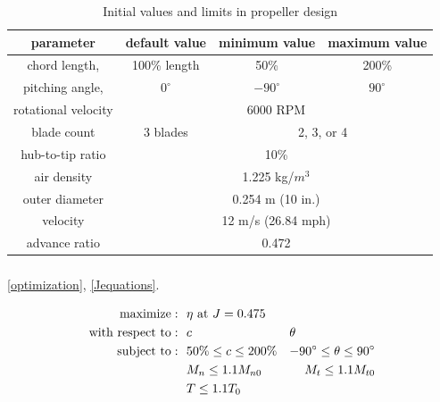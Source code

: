\documentclass[journal ]{new-aiaa}
\newcounter{ctab}
\begin{document}
\begin{table}[H]
 \centering
 \begin{tabular}{| c | c | c | c |} \hline
 	 \textbf{parameter} & \textbf{default value} & \textbf{minimum value} & \textbf{maximum value} \\ \hline
	 chord length, & 100\% length & 50\% & 200\% \\ \hline
	 pitching angle, & $0^{\circ}$ & $-90^{\circ}$ & $90^{\circ}$ \\ \hline \hline
	 rotational velocity & \multicolumn{3}{c|}{6000 RPM} \\ \hline
	 blade count & 3 blades & \multicolumn{2}{c|}{2, 3, or 4}\\ \hline
	 hub-to-tip ratio & \multicolumn{3}{c|}{10\%} \\ \hline
	 air density & \multicolumn{3}{c|}{1.225 kg/$m^{3}$} \\ \hline
	 outer diameter & \multicolumn{3}{c|}{0.254 m (10 in.)} \\ \hline
	 velocity & \multicolumn{3}{c|}{12 m/s (26.84 mph)} \\ \hline
	 advance ratio & \multicolumn{3}{c|}{0.472} \\ \hline
 \end{tabular}
 \caption{Initial values and limits in propeller design}
 \label{ctab}
\end{table}

\subsubsection{}

 \eqref{optimization},  \eqref{Jequations}. 

\begin{equation}
	\begin{aligned}
		\mathrm{maximize:}& ~~ \eta ~ \text{at} ~ J = 0.475 \\
		\mathrm{with~respect~to:}& ~~ c & \multicolumn{1}{l}{$\theta$} \\
		\mathrm{subject~to:}& ~~ 50\% \leq c \leq 200\% & -90^{\circ} \leq \theta \leq 90^{\circ} \\
		& ~~ M_{n} \leq 1.1 M_{n0} & M_{t} \leq 1.1 M_{t0} \\
		& ~~ T \leq 1.1 T_{0} \\
	\end{aligned}
	\label{optimization}
\end{equation}
\end{document}
